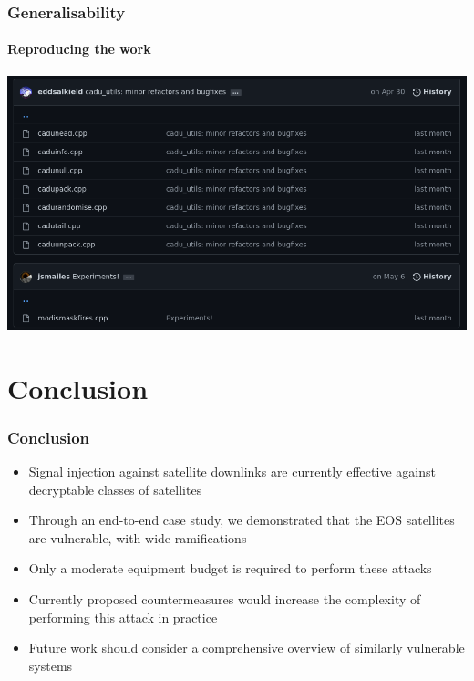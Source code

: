 \documentclass{beamer}
\begin{document}
\begin{frame}
  \frametitle{Generalisability}
  \framesubtitle{Reproducing the work}
  \includegraphics[width=\textwidth]{images/code_tools.png}
\end{frame}

\section{Conclusion}

\begin{frame}
  \frametitle{Conclusion}
  \begin{itemize}
    \item Signal injection against satellite downlinks are currently effective against decryptable classes of satellites
    \item Through an end-to-end case study, we demonstrated that the EOS satellites are vulnerable, with wide ramifications
    \item Only a moderate equipment budget is required to perform these attacks
    \item Currently proposed countermeasures would increase the complexity of performing this attack in practice
    \item Future work should consider a comprehensive overview of similarly vulnerable systems
  \end{itemize}
\end{frame}

\end{document}
